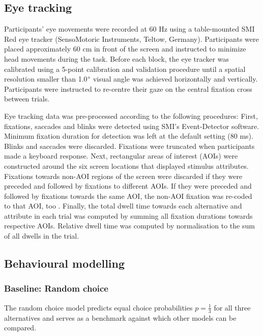 \documentclass[11pt, a4paper]{article}
\begin{document}
\subsection*{Eye tracking}
\label{sec:methods:eye-tracking}

Participants’ eye movements were recorded at 60 Hz using a table-mounted SMI Red eye tracker (SensoMotoric Instruments, Teltow, Germany). Participants were placed approximately 60 cm in front of the screen and instructed to minimize head movements during the task. Before each block, the eye tracker was calibrated using a 5-point calibration and validation procedure until a spatial resolution smaller than 1.0$\degree$ visual angle was achieved horizontally and vertically. Participants were instructed to re-centre their gaze on the central fixation cross between trials.

Eye tracking data was pre-processed according to the following procedures: First, fixations, saccades and blinks were detected using SMI’s Event-Detector software. Minimum fixation duration for detection was left at the default setting (80 ms). Blinks and saccades were discarded. Fixations were truncated when participants made a keyboard response. Next, rectangular areas of interest (AOIs) were constructed around the six screen locations that displayed stimulus attributes. Fixations towards non-AOI regions of the screen were discarded if they were preceded and followed by fixations to different AOIs. If they were preceded and followed by fixations towards the same AOI, the non-AOI fixation was re-coded to that AOI, too \parencite[see][]{krajbich2010VisualFixationsComputation,krajbich2011MultialternativeDriftdiffusionModel}. Finally, the total dwell time towards each alternative and attribute in each trial was computed by summing all fixation durations towards respective AOIs. Relative dwell time was computed by normalisation to the sum of all dwells in the trial.

\subsection*{Behavioural modelling}
\label{sec:methods:behavioural-modelling}

\subsubsection*{Baseline: Random choice}

The random choice model predicts equal choice probabilities $p=\frac{1}{3}$ for all three alternatives and serves as a benchmark against which other models can be compared.
\end{document}
